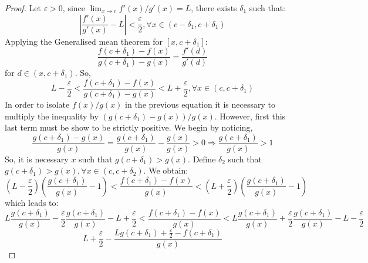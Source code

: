 \begin{proof}
    Let $\varepsilon > 0$, since $\lim_{x \to c} f'(x)/g'(x) = L$, there exists $\delta_1$ such that:
    \begin{equation*}
        \left |
            \frac{f'(x)}{g'(x)} - L
        \right | < \frac{\varepsilon}{2}, \forall x \in (c-\delta_1, c+\delta_1)
    \end{equation*}
    Applying the Generalised mean theorem for $[x, c + \delta_1]$:
    \begin{equation*}
        \frac{f(c + \delta_1) - f(x)}{g(c + \delta_1) - g(x)} = \frac{f'(d)}{g'(d)}
    \end{equation*}
    for $d \in (x, c + \delta_1)$. So,
    \begin{equation*}
        L -  \frac{\varepsilon}{2} < \frac{f(c + \delta_1) - f(x)}{g(c + \delta_1) - g(x)} < L + \frac{\varepsilon}{2}, \forall x \in (c, c+\delta_1)
    \end{equation*}
    In order to isolate $f(x)/g(x)$ in the previous equation it is necessary to multiply the inequality by $(g(c+\delta_1) - g(x))/g(x)$. However, first this last term must be show to be strictly positive. We begin by noticing,
    \begin{equation*}
        \frac{g(c+\delta_1) - g(x)}{g(x)} = \frac{g(c+\delta_1)}{g(x)} - \frac{g(x)}{g(x)} > 0 \Longrightarrow \frac{g(c+\delta_1)}{g(x)} > 1
    \end{equation*}
    So, it is necessary $x$ such that $g(c + \delta_1) > g(x)$. Define $\delta_2$ such that $g(c + \delta_1) > g(x), \forall x \in (c, c+\delta_2)$. We obtain:
    \begin{equation*}
        \left( L - \frac{\varepsilon}{2} \right)
        \left( \frac{g(c+\delta_1)}{g(x)} - 1 \right)
        <
        \frac{f(c+\delta_1) - f(x)}{g(x)}
        <
        \left( L + \frac{\varepsilon}{2} \right)
        \left( \frac{g(c+\delta_1)}{g(x)} - 1 \right)
    \end{equation*}
    which leads to:
    \begin{equation*}
        L\frac{g(c+\delta_1)}{g(x)} - \frac{\varepsilon}{2}\frac{g(c+\delta_1)}{g(x)}
        - L + \frac{\varepsilon}{2}
        <
        \frac{f(c+\delta_1) - f(x)}{g(x)}
        <
        L\frac{g(c+\delta_1)}{g(x)} + \frac{\varepsilon}{2}\frac{g(c+\delta_1)}{g(x)}
        - L - \frac{\varepsilon}{2}
    \end{equation*}
    \begin{equation*}
        L + \frac{\varepsilon}{2} - \frac{Lg(c+\delta_1) + \frac{\varepsilon}{2} - f(c+\delta_1)}{g(x)}

\end{equation*}
\end{proof}
